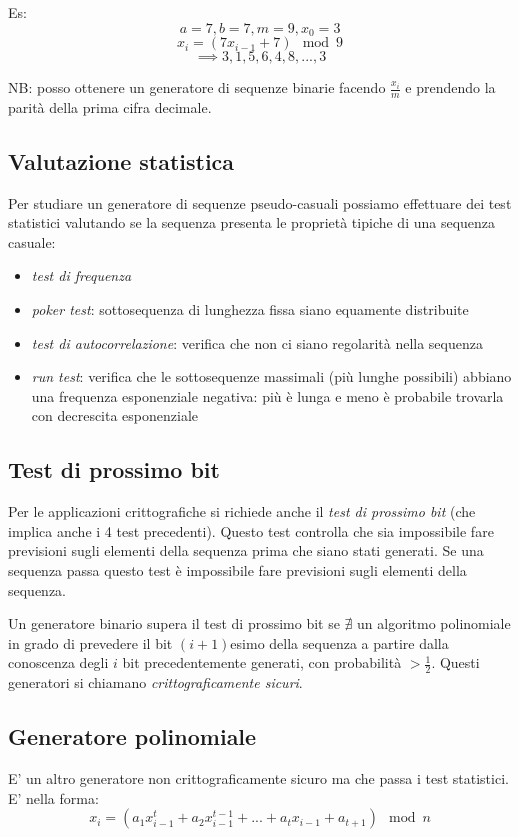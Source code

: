 Es:
$$ a=7, b=7, m=9, x_{0}=3 $$
$$ x_i = (7x_{i-1} + 7) \mod 9 $$
$$ \implies 3, 1, 5, 6, 4, 8, ... , 3 $$

NB: posso ottenere un generatore di sequenze binarie facendo $\frac{x_i}{m}$ e prendendo la parità della prima cifra decimale.

\subsection{Valutazione statistica}
Per studiare un generatore di sequenze pseudo-casuali possiamo effettuare dei test statistici valutando se la sequenza presenta le proprietà tipiche di una sequenza casuale:
\begin{itemize}
    \item \emph{test di frequenza}
    \item \emph{poker test}: sottosequenza di lunghezza fissa siano equamente distribuite
    \item \emph{test di autocorrelazione}: verifica che non ci siano regolarità nella sequenza
    \item \emph{run test}: verifica che le sottosequenze massimali (più lunghe possibili) abbiano una frequenza esponenziale negativa: più è lunga e meno è probabile trovarla con decrescita esponenziale
\end{itemize}

\subsection{Test di prossimo bit}
Per le applicazioni crittografiche si richiede anche il \emph{test di prossimo bit} (che implica anche i 4 test precedenti). Questo test controlla che sia impossibile fare previsioni sugli elementi della sequenza prima che siano stati generati. Se una sequenza passa questo test è impossibile fare previsioni sugli elementi della sequenza.

Un generatore binario supera il test di prossimo bit se $ \nexists $ un algoritmo polinomiale in grado di prevedere il bit $(i+1)$esimo della sequenza a partire dalla conoscenza degli $i$ bit precedentemente generati, con probabilità $> \frac{1}{2}$. Questi generatori si chiamano \emph{crittograficamente sicuri}.

\subsection{Generatore polinomiale}
E' un altro generatore non crittograficamente sicuro ma che passa i test statistici. E' nella forma:
$$ x_{i} = \left( a_{1}x_{i-1}^{t} + a_{2}x_{i-1}^{t-1} + ... + a_{t}x_{i-1} + a_{t+1} \right) \mod n $$

